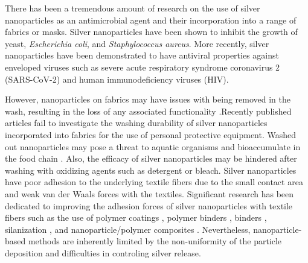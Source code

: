 \documentclass[10pt,letterpaper]{article}
\begin{document}

There has been a tremendous amount of research on the use of silver nanoparticles as an antimicrobial agent \cite{lansdown:06,Rai:09}
 and their incorporation into 
a range of 
fabrics or masks.\cite{bu_fabrication_2019,perera_morphological_2013, lvm:10, zhong_plasmonic_2020,tremiliosi_ag_2020,abulikemu:2022} 
Silver nanoparticles have been shown to inhibit the growth of yeast, \textit{Escherichia coli}, and \textit{Staphylococcus aureus}. \cite{Kim:07mar} %
More recently, silver nanoparticles have been demonstrated to have antiviral properties against enveloped viruses such as severe acute respiratory syndrome coronavirus 2 (SARS-CoV-2) and human immunodeficiency viruses (HIV).\cite{jeremiah_potent_2020,lara_2010,elechiguerra_interaction_2005} %

However, nanoparticles on fabrics may have issues with being removed in the wash, resulting in the loss of any associated functionality \cite{Lorenz:12,Impellitteri:09}.Recently published articles fail to investigate the washing durability of silver nanoparticles incorporated into fabrics for the use of personal protective equipment.\cite{abulikemu:2022,zhong_plasmonic_2020}
Washed out nanoparticles 
may pose a threat to aquatic organisms \cite{Krysanov:10,Ma:13_nanoparticle,Fabrega:11,Pillai:14}
and bioaccumulate in the food chain \cite{Uddin:20}.
Also, the efficacy of silver nanoparticles may be hindered after washing with oxidizing agents such as detergent or bleach.\cite{lansdown:06,Impellitteri:09} 
Silver nanoparticles 
have poor adhesion to the underlying textile fibers due to the small contact area and weak van der Waals forces with the textiles.  Significant research has been dedicated to improving the adhesion forces of silver nanoparticles with textile fibers
such as the use of polymer coatings 
\cite{dastjerdi:2009}, 
polymer binders \cite{Zhang:13feb}, 
binders \cite{Zhou:18,abulikemu:2022}, silanization \cite{shen:2019}, and nanoparticle/polymer composites \cite{Zahran:14}.
Nevertheless, nanoparticle-based methods
are inherently limited by the non-uniformity of the particle deposition and difficulties in controling silver release.\cite{geranio:2009,mitrano:2014}
\end{document}
